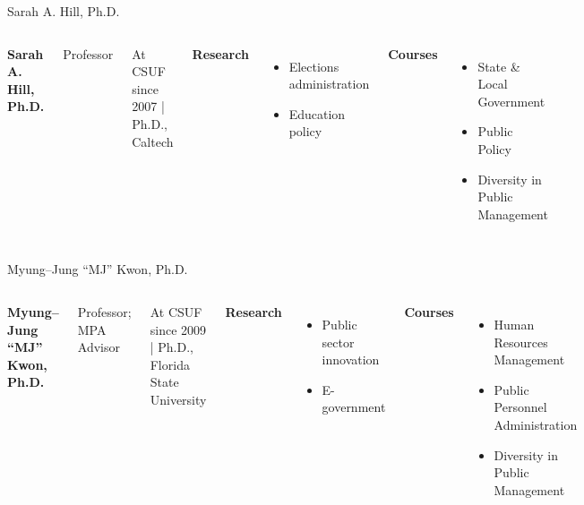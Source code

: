 \documentclass[10pt]{beamer}
\begin{document}
\begin{frame}{Sarah A. Hill, Ph.D.}
\begin{columns}[T,onlytextwidth]
    \raggedright
    {\large\bfseries Sarah A. Hill, Ph.D.}\par
    {Professor}\par
    {\footnotesize At CSUF since 2007 \quad | \quad Ph.D., Caltech}\par\vspace{0.4em}

    \textbf{Research}
    \begin{itemize}
      \item Elections administration
      \item Education policy
    \end{itemize}

    \textbf{Courses}
    \begin{itemize}
      \item State \& Local Government
      \item Public Policy
      \item Diversity in Public Management
    \end{itemize}

    \vspace*{0.25cm}
\end{columns}
\end{frame}

\begin{frame}{Myung--Jung ``MJ'' Kwon, Ph.D.}
\begin{columns}[T,onlytextwidth]
    \raggedright
  {\large\bfseries Myung--Jung ``MJ'' Kwon, Ph.D.}\par
    {Professor; MPA Advisor}\par
    {\footnotesize At CSUF since 2009 \quad | \quad Ph.D., Florida State University}\par\vspace{0.4em}

    \textbf{Research}
    \begin{itemize}
      \item Public sector innovation
      \item E-government
    \end{itemize}

    \textbf{Courses}
    \begin{itemize}
      \item Human Resources Management
      \item Public Personnel Administration
      \item Diversity in Public Management
    \end{itemize}

    \vspace*{0.25cm}
\end{columns}
\end{frame}
\end{document}
